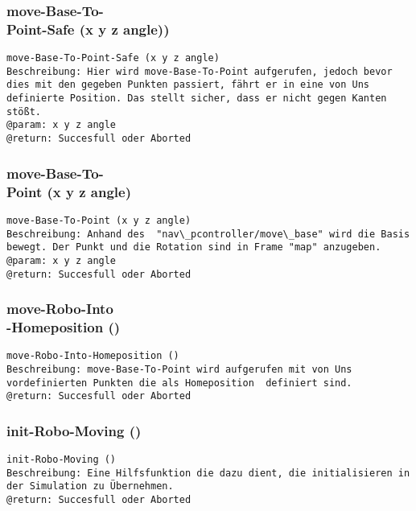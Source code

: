 \documentclass{suturo}
\begin{document}
\subsubsection{move-Base-To-\\
Point-Safe (x y z angle))
}
\begin{verbatim}
move-Base-To-Point-Safe (x y z angle)
Beschreibung: Hier wird move-Base-To-Point aufgerufen, jedoch bevor dies mit den gegeben Punkten passiert, fährt er in eine von Uns definierte Position. Das stellt sicher, dass er nicht gegen Kanten stößt. 
@param: x y z angle
@return: Succesfull oder Aborted
\end{verbatim}


\subsubsection{move-Base-To-\\
Point (x y z angle)}
\begin{verbatim}
move-Base-To-Point (x y z angle)
Beschreibung: Anhand des  "nav\_pcontroller/move\_base" wird die Basis bewegt. Der Punkt und die Rotation sind in Frame "map" anzugeben.
@param: x y z angle
@return: Succesfull oder Aborted
\end{verbatim}




\subsubsection{move-Robo-Into\\
-Homeposition ()}
\begin{verbatim}
move-Robo-Into-Homeposition ()
Beschreibung: move-Base-To-Point wird aufgerufen mit von Uns vordefinierten Punkten die als Homeposition  definiert sind.
@return: Succesfull oder Aborted
\end{verbatim}


\subsubsection{init-Robo-Moving ()}
\begin{verbatim}
init-Robo-Moving ()
Beschreibung: Eine Hilfsfunktion die dazu dient, die initialisieren in der Simulation zu Übernehmen.
@return: Succesfull oder Aborted
\end{verbatim}
\end{document}
